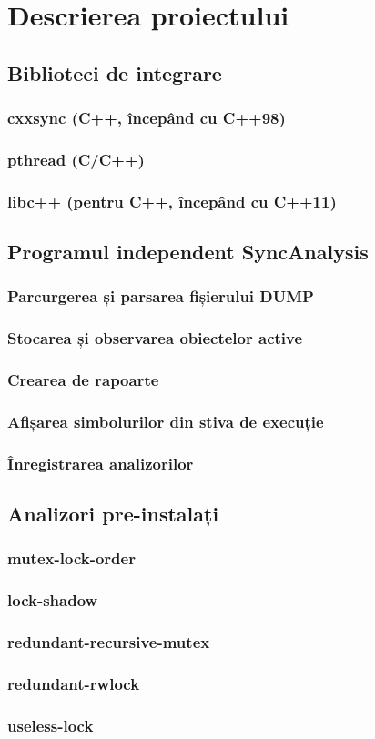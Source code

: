 \section{Descrierea proiectului}




\subsection{Biblioteci de integrare}
\subsubsection{cxxsync (C++, începând cu C++98)}
\subsubsection{pthread (C/C++)}
\subsubsection{libc++ (pentru C++, începând cu C++11)}
\subsection{Programul independent SyncAnalysis}
\subsubsection{Parcurgerea și parsarea fișierului DUMP}
\subsubsection{Stocarea și observarea obiectelor active}
\subsubsection{Crearea de rapoarte}
\subsubsection{Afișarea simbolurilor din stiva de execuție}
\subsubsection{Înregistrarea analizorilor}
\subsection{Analizori pre-instalați}
\subsubsection{mutex-lock-order}
\subsubsection{lock-shadow}
\subsubsection{redundant-recursive-mutex}
\subsubsection{redundant-rwlock}
\subsubsection{useless-lock}
